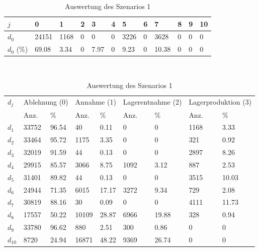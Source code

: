 \begin{table}[h!]
\renewcommand{\arraystretch}{1.5}
  \begin{center}
    \caption{Auswertung des Szenarios 1}  \label{AS1}
    \vspace*{3mm}
    \begin{tabular}{l l l l l l l l l l l l }  \hline 
         $j$ & 0 & 1  & 2 & 3 & 4  & 5 & 6 & 7 & 8 & 9 & 10  \\ \hline
$d_{0}$ &  24151 &  1168 &  0 &  0 &  0 &  3226 &  0 &   3628 &  0 &  0 &  0 \\
$d_{0}$ (\%) &  69.08 &  3.34 &  0 &  7.97 &  0 &  9.23 &  0 &  10.38 &  0 &  0 &  0 \\
\hline
    \end{tabular} \\[3mm]
        \begin{tabular}{ l l l l l l l l l}   \hline    %
    $d_j$ & \multicolumn{2}{c}{Ablehnung (0)} & \multicolumn{2}{c}{Annahme (1)}  & \multicolumn{2}{c}{Lagerentnahme (2)} & \multicolumn{2}{c}{Lagerproduktion (3)}\\
    & Anz. & \% & Anz. & \% & Anz. & \% & Anz. & \% \\ \hline 
$d_{1}$  &  33752 &  96.54 &     40 &   0.11 &   0 &    0 &  1168 &   3.33 \\
$d_{2}$  &  33464 &  95.72 &   1175 &   3.35 &   0 &    0 &   321 &   0.92 \\
$d_{3}$  &  32019 &  91.59 &     44 &   0.13 &   0 &    0 &  2897 &   8.26 \\
$d_{4}$  &  29915 &  85.57 &   3066 &   8.75 &  1092 &   3.12 &   887 &   2.53 \\
$d_{5}$  &  31401 &  89.82 &     44 &   0.13 &   0 &    0 &  3515 &  10.03 \\
$d_{6}$  &  24944 &  71.35 &   6015 &  17.17 &  3272 &   9.34 &   729 &   2.08 \\
$d_{7}$  &  30819 &  88.16 &     30 &   0.09 &   0 &    0 &  4111 &  11.73 \\
$d_{8}$  &  17557 &  50.22 &  10109 &  28.87 &  6966 &  19.88 &   328 &   0.94 \\
$d_{9}$  &  33780 &  96.62 &    880 &   2.51 &   300 &   0.86 &   0 &    0 \\
$d_{10}$ &   8720 &  24.94 &  16871 &  48.22 &  9369 &  26.74 &   0 &    0 \\
          \hline
   \end{tabular} \\[3mm]
     \end{center}
\end{table}

